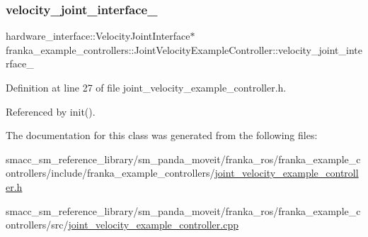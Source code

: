 \subsubsection{\texorpdfstring{velocity\+\_\+joint\+\_\+interface\+\_\+}{velocity\_joint\_interface\_}}
{\footnotesize\ttfamily hardware\+\_\+interface\+::\+Velocity\+Joint\+Interface$\ast$ franka\+\_\+example\+\_\+controllers\+::\+Joint\+Velocity\+Example\+Controller\+::velocity\+\_\+joint\+\_\+interface\+\_\+\hspace{0.3cm}{\ttfamily [private]}}



Definition at line 27 of file joint\+\_\+velocity\+\_\+example\+\_\+controller.\+h.



Referenced by init().



The documentation for this class was generated from the following files\+:\begin{DoxyCompactItemize}
\item 
smacc\+\_\+sm\+\_\+reference\+\_\+library/sm\+\_\+panda\+\_\+moveit/franka\+\_\+ros/franka\+\_\+example\+\_\+controllers/include/franka\+\_\+example\+\_\+controllers/\hyperlink{joint__velocity__example__controller_8h}{joint\+\_\+velocity\+\_\+example\+\_\+controller.\+h}\item 
smacc\+\_\+sm\+\_\+reference\+\_\+library/sm\+\_\+panda\+\_\+moveit/franka\+\_\+ros/franka\+\_\+example\+\_\+controllers/src/\hyperlink{joint__velocity__example__controller_8cpp}{joint\+\_\+velocity\+\_\+example\+\_\+controller.\+cpp}\end{DoxyCompactItemize}
